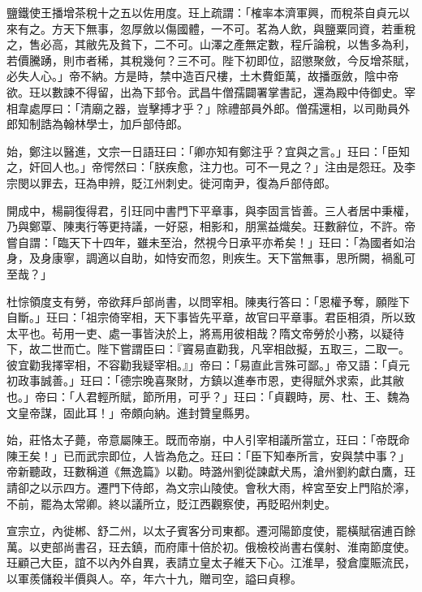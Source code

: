 \begin{pinyinscope}
 鹽鐵使王播增茶稅十之五以佐用度。玨上疏謂：「榷率本濟軍興，而稅茶自貞元以來有之。方天下無事，忽厚斂以傷國體，一不可。茗為人飲，與鹽粟同資，若重稅之，售必高，其敝先及貧下，二不可。山澤之產無定數，程斤論稅，以售多為利，若價騰踴，則市者稀，其稅幾何？三不可。陛下初即位，詔懲聚斂，今反增茶賦，必失人心。」帝不納。方是時，禁中造百尺樓，土木費鉅萬，故播亟斂，陰中帝欲。玨以數諫不得留，出為下邽令。武昌牛僧孺闢署掌書記，還為殿中侍御史。宰相韋處厚曰：「清廟之器，豈擊搏才乎？」除禮部員外郎。僧孺還相，以司勛員外郎知制誥為翰林學士，加戶部侍郎。



 始，鄭注以醫進，文宗一日語玨曰：「卿亦知有鄭注乎？宜與之言。」玨曰：「臣知之，奸回人也。」帝愕然曰：「朕疾愈，注力也。可不一見之？」注由是怨玨。及李宗閔以罪去，玨為申辨，貶江州刺史。徙河南尹，復為戶部侍郎。



 開成中，楊嗣復得君，引玨同中書門下平章事，與李固言皆善。三人者居中秉權，乃與鄭覃、陳夷行等更持議，一好惡，相影和，朋黨益熾矣。玨數辭位，不許。帝嘗自謂：「臨天下十四年，雖未至治，然視今日承平亦希矣！」玨曰：「為國者如治身，及身康寧，調適以自助，如恃安而忽，則疾生。天下當無事，思所闕，禍亂可至哉？」



 杜悰領度支有勞，帝欲拜戶部尚書，以問宰相。陳夷行答曰：「恩權予奪，願陛下自斷。」玨曰：「祖宗倚宰相，天下事皆先平章，故官曰平章事。君臣相須，所以致太平也。茍用一吏、處一事皆決於上，將焉用彼相哉？隋文帝勞於小務，以疑待下，故二世而亡。陛下嘗謂臣曰：『竇易直勸我，凡宰相啟擬，五取三，二取一。彼宜勸我擇宰相，不容勸我疑宰相。』」帝曰：「易直此言殊可鄙。」帝又語：「貞元初政事誠善。」玨曰：「德宗晚喜聚財，方鎮以進奉市恩，吏得賦外求索，此其敝也。」帝曰：「人君輕所賦，節所用，可乎？」玨曰：「貞觀時，房、杜、王、魏為文皇帝謀，固此耳！」帝頗向納。進封贊皇縣男。



 始，莊恪太子薨，帝意屬陳王。既而帝崩，中人引宰相議所當立，玨曰：「帝既命陳王矣！」已而武宗即位，人皆為危之。玨曰：「臣下知奉所言，安與禁中事？」帝新聽政，玨數稱道《無逸篇》以勸。時潞州劉從諫獻犬馬，滄州劉約獻白鷹，玨請卻之以示四方。遷門下侍郎，為文宗山陵使。會秋大雨，梓宮至安上門陷於濘，不前，罷為太常卿。終以議所立，貶江西觀察使，再貶昭州刺史。



 宣宗立，內徙郴、舒二州，以太子賓客分司東都。遷河陽節度使，罷橫賦宿逋百餘萬。以吏部尚書召，玨去鎮，而府庫十倍於初。俄檢校尚書右僕射、淮南節度使。玨顧己大臣，誼不以內外自異，表請立皇太子維天下心。江淮旱，發倉廩賑流民，以軍羨儲殺半價與人。卒，年六十九，贈司空，謚曰貞穆。




\end{pinyinscope}
